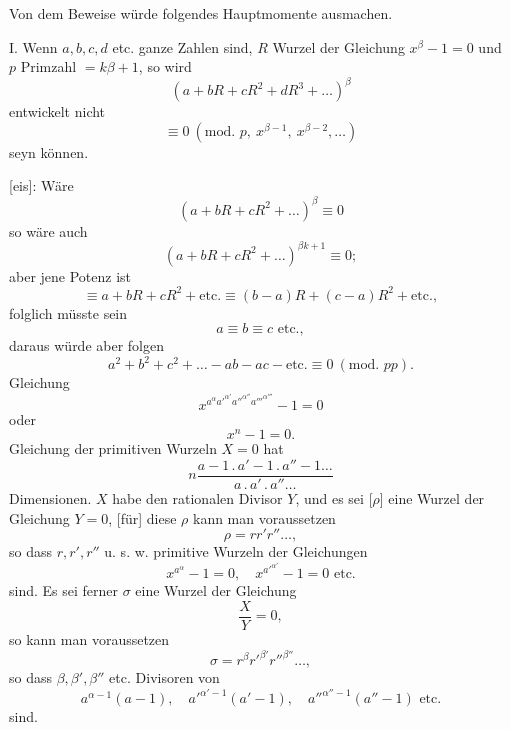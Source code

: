 Von dem Beweise würde folgendes Hauptmomente ausmachen.

I. Wenn $a,b,c,d$ etc. ganze Zahlen sind, $R$ Wurzel der Gleichung $x^\beta-1=0$
und $p$ Primzahl $=k\beta+1$, so wird
\[(a+bR+cR^2+dR^3+\ldots)^\beta\]
\noindent entwickelt nicht
\[\equiv0\ (\text{mod. }p,\ x^{\beta-1},\ x^{\beta-2},\ldots)\]
\noindent seyn können.

[eis]: Wäre
\[(a+bR+cR^2+\ldots)^\beta\equiv0\]
\noindent so wäre auch
\[(a+bR+cR^2+\ldots)^{\beta k+1}\equiv0;\]
\noindent aber jene Potenz ist
\[\equiv a+bR+cR^2+\text{etc.}\equiv(b-a)R+(c-a)R^2+\text{etc.},\]
\noindent folglich müsste sein
\[a\equiv b\equiv c\text{ etc.},\]
\noindent daraus würde aber folgen
\[a^2+b^2+c^2+\ldots-ab-ac-\text{etc.}\equiv0\ (\text{mod. }pp).\]
\clearpage
{}
\noindent\hspace*{\parindent}Gleichung
\[x^{a^\alpha{a'}^{\alpha'}{a''}^{\alpha''}{a'''}^{\alpha'''}}-1=0\]
\noindent oder
\[x^n-1=0.\]
\noindent [Die] Gleichung der primitiven Wurzeln $X=0$ hat
\[n\frac{a-1\mathpunct{.}a'-1\mathpunct{.}a''-1\ldots}{a\mathpunct{.}a'\mathpunct{.}a''\ldots}\]
\noindent Dimensionen. $X$ habe den rationalen Divisor $Y$, und es sei [$\rho$] eine Wurzel
der Gleichung $Y=0$, [für] diese $\rho$ kann man voraussetzen
\[\rho=rr'r''\ldots,\]
\noindent so dass $r,r',r''$ u. s. w. primitive Wurzeln der Gleichungen
\[x^{a^\alpha}-1=0,\quad x^{{a'}^{\alpha'}}-1=0\text{ etc.}\]
\noindent sind. Es sei ferner $\sigma$ eine Wurzel der Gleichung
\[\frac XY=0,\]
\noindent so kann man voraussetzen
\[\sigma=r^\beta{r'}^{\beta'}{r''}^{\beta''}\ldots,\]
\noindent so dass $\beta,\beta',\beta''$ etc. Divisoren von
\[a^{\alpha-1}(a-1),\quad{a'}^{\alpha'-1}(a'-1),\quad{a''}^{\alpha''-1}(a''-1)\text{ etc.}\]
\noindent sind.

